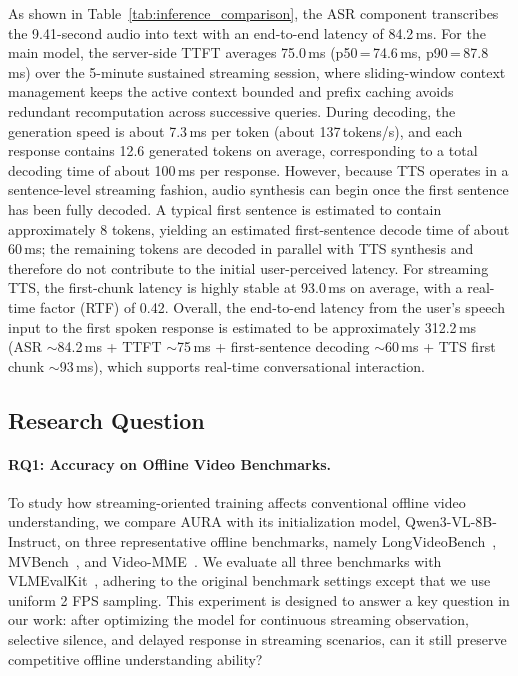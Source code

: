 As shown in Table~\ref{tab:inference_comparison}, the ASR component transcribes the 9.41-second audio into text with an end-to-end latency of 84.2\,ms. For the main model, the server-side TTFT averages 75.0\,ms (p50\,=\,74.6\,ms, p90\,=\,87.8\,ms) over the 5-minute sustained streaming session, where sliding-window context management keeps the active context bounded and prefix caching avoids redundant recomputation across successive queries. During decoding, the generation speed is about 7.3\,ms per token (about 137\,tokens/s), and each response contains 12.6 generated tokens on average, corresponding to a total decoding time of about 100\,ms per response. However, because TTS operates in a sentence-level streaming fashion, audio synthesis can begin once the first sentence has been fully decoded. A typical first sentence is estimated to contain approximately 8 tokens, yielding an estimated first-sentence decode time of about 60\,ms; the remaining tokens are decoded in parallel with TTS synthesis and therefore do not contribute to the initial user-perceived latency. For streaming TTS, the first-chunk latency is highly stable at 93.0\,ms on average, with a real-time factor (RTF) of 0.42. Overall, the end-to-end latency from the user's speech input to the first spoken response is estimated to be approximately 312.2\,ms (ASR $\sim$84.2\,ms + TTFT $\sim$75\,ms + first-sentence decoding $\sim$60\,ms + TTS first chunk $\sim$93\,ms), which supports real-time conversational interaction.





\subsection{Research Question}

\paragraph{RQ1: Accuracy on Offline Video Benchmarks.}

To study how streaming-oriented training affects conventional offline video understanding, we compare AURA with its initialization model, Qwen3-VL-8B-Instruct, on three representative offline benchmarks, namely LongVideoBench~\citep{wu2024longvideobench}, MVBench~\citep{li2024mvbench}, and Video-MME~\citep{fu2025video}. We evaluate all three benchmarks with VLMEvalKit~\citep{duan2024vlmevalkit}, adhering to the original benchmark settings except that we use uniform 2 FPS sampling. This experiment is designed to answer a key question in our work: after optimizing the model for continuous streaming observation, selective silence, and delayed response in streaming scenarios, can it still preserve competitive offline understanding ability?

